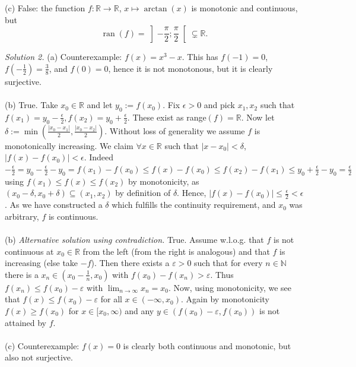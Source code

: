 \begin{solution}
    \\\\
    (c) False: the function \( f \colon \mathbb{R} \to \mathbb{R} \), \( x \mapsto \arctan\left(x\right) \) is monotonic and continuous, but
    \[
        \operatorname{ran}\left(f\right) = \left]-\frac{\pi}{2};\frac{\pi}{2}\right[ \subsetneq \mathbb{R}.
    \]

    \textit{Solution 2.}
    (a) Counterexample: \( f(x) = x^3-x \). This has \( f(-1)=0 \), \( f(-\frac{1}{2}) = \frac{3}{8} \), and \( f(0)=0 \), hence it is not monotonous, but it is clearly surjective. \\
    \\
    (b) True. Take \( x_0 \in \mathbb{R} \) and let \( y_0 := f(x_0) \). Fix \( \epsilon > 0 \) and pick \( x_1,x_2 \) such that \( f(x_1)=y_0 - \frac{\epsilon}{2}, f(x_2)=y_0 + \frac{\epsilon}{2} \). These exist as range\( (f) = \mathbb{R} \). Now let \( \delta := \min(\frac{|x_0 - x_1|}{2}, \frac{|x_0 - x_2|}{2}) \). Without loss of generality we assume \( f \) is monotonically increasing. We claim \( \forall x \in \mathbb{R} \) such that \( |x-x_0| < \delta \), \( |f(x)-f(x_0)| < \epsilon \). Indeed \( - \frac{\epsilon}{2} = y_0 - \frac{\epsilon}{2} - y_0 = f(x_1)-f(x_0) \leq f(x)-f(x_0) \leq f(x_2)- f(x_1) \leq y_0 + \frac{\epsilon}{2} - y_0 = \frac{\epsilon}{2} \) using \( f(x_1) \leq f(x) \leq f(x_2) \) by monotonicity, as \( (x_0-\delta, x_0+\delta) \subseteq (x_1,x_2) \) by definition of \( \delta \). Hence, \( |f(x)-f(x_0)| \leq \frac{\epsilon}{2} < \epsilon \). As we have constructed a \( \delta \) which fulfills the continuity requirement, and \( x_0 \) was arbitrary, \( f \) is continuous.\\
    \\
    (b) \textit{Alternative solution using contradiction.} True. Assume w.l.o.g. that \( f \) is not continuous at \( x_0\in\mathbb{R} \) from the left (from the right is analogous) and that \( f \) is increasing (else take \( -f \)). Then there exists a \( \varepsilon>0 \) such that for every \( n\in\mathbb{N} \) there is a \( x_n\in(x_0-\frac{1}{n},x_0) \) with \( f(x_0)-f(x_n)>\varepsilon \). Thus \( f(x_n)\le f(x_0)-\varepsilon \) with \( \lim_{n\to\infty} x_n=x_0 \). Now, using monotonicity, we see that \( f(x)\le f(x_0)-\varepsilon \) for all \( x\in(-\infty,x_0) \). Again by monotonicity \( f(x)\ge f(x_0) \) for \( x\in[x_0,\infty) \) and any \( y\in(f(x_0)-\varepsilon,f(x_0)) \) is not attained by \( f \).\\
    \\
    (c) Counterexample: \( f(x)=0 \) is clearly both continuous and monotonic, but also not surjective.
\end{solution}
